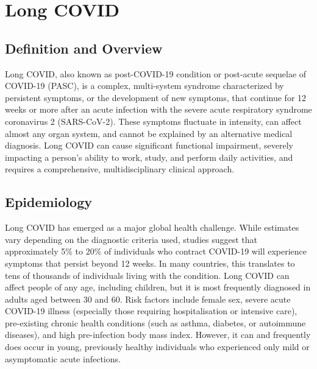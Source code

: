 \chapter{Long COVID}

\section*{Definition and Overview}
Long COVID, also known as post-COVID-19 condition or post-acute sequelae of COVID-19 (PASC), is a complex, multi-system syndrome characterized by persistent symptoms, or the development of new symptoms, that continue for 12 weeks or more after an acute infection with the severe acute respiratory syndrome coronavirus 2 (SARS-CoV-2). These symptoms fluctuate in intensity, can affect almost any organ system, and cannot be explained by an alternative medical diagnosis. Long COVID can cause significant functional impairment, severely impacting a person's ability to work, study, and perform daily activities, and requires a comprehensive, multidisciplinary clinical approach.

\section*{Epidemiology}
Long COVID has emerged as a major global health challenge. While estimates vary depending on the diagnostic criteria used, studies suggest that approximately 5\% to 20\% of individuals who contract COVID-19 will experience symptoms that persist beyond 12 weeks. In many countries, this translates to tens of thousands of individuals living with the condition. Long COVID can affect people of any age, including children, but it is most frequently diagnosed in adults aged between 30 and 60. Risk factors include female sex, severe acute COVID-19 illness (especially those requiring hospitalisation or intensive care), pre-existing chronic health conditions (such as asthma, diabetes, or autoimmune diseases), and high pre-infection body mass index. However, it can and frequently does occur in young, previously healthy individuals who experienced only mild or asymptomatic acute infections.

